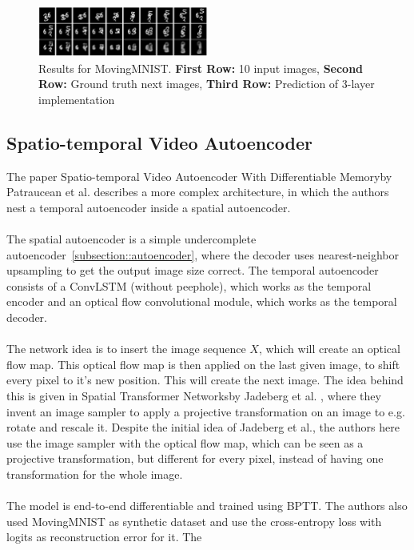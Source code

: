   \begin{figure}[H]
   \includegraphics[width=0.5\textwidth]{../Images/shi_results_mnist.png}
   \centering
   \caption{Results for MovingMNIST. \textbf{First Row:} 10 input images, \textbf{Second Row:} Ground truth next images, \textbf{Third Row:} Prediction of 3-layer implementation \cite{Shi2015}}
   \label{fig:convlstm_results}
  \end{figure}
 
 \subsection{Spatio-temporal Video Autoencoder}
  The paper \glqq Spatio-temporal Video Autoencoder With Differentiable Memory\grqq by Patraucean et al. \cite{Patraucean2015} describes a more complex architecture, in which the authors
  nest a temporal autoencoder inside a spatial autoencoder.
  \\\\  
  The spatial autoencoder is a simple undercomplete autoencoder~\ref{subsection::autoencoder}, where the decoder uses nearest-neighbor
  upsampling to get the output image size correct. The temporal autoencoder consists of a ConvLSTM (without peephole), which works as the temporal 
  encoder and an optical flow convolutional module, which works
  as the temporal decoder.
  \\\\
  The network idea is to insert the image sequence $X$, which will create an optical flow map. This optical flow map is then applied on the last given image, to 
  shift every pixel to it's new position. This will create the next image. The idea behind this is given in \glqq Spatial Transformer Networks\grqq by Jadeberg et 
  al. \cite{Jadeberg2015}, where they invent an image sampler to apply a projective transformation on an image to e.g. rotate and rescale it. Despite the initial 
  idea
  of Jadeberg et al., the authors here use the image sampler with the optical flow map, which can be seen as a projective transformation, but different for every 
  pixel, instead of having one transformation for the whole image.
  \\\\
  The model is end-to-end differentiable and trained using BPTT. The authors also used MovingMNIST as synthetic dataset and use the cross-entropy loss with logits as reconstruction error for it. The 
